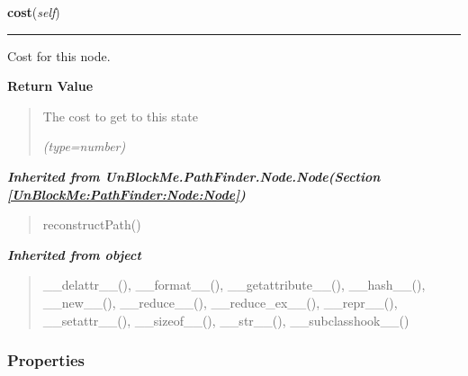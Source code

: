    \label{UnBlockMe:PathFinder:AStarNode:AStarNode:cost}

    \vspace{0.5ex}

\hspace{.8\funcindent}\begin{boxedminipage}{\funcwidth}

    \raggedright \textbf{cost}(\textit{self})

    \vspace{-1.5ex}

    \rule{\textwidth}{0.5\fboxrule}
\setlength{\parskip}{2ex}
    Cost for this node.

\setlength{\parskip}{1ex}
      \textbf{Return Value}
    \vspace{-1ex}

      \begin{quote}
      The cost to get to this state

      {\it (type=number)}

      \end{quote}

    \end{boxedminipage}


\large{\textbf{\textit{Inherited from UnBlockMe.PathFinder.Node.Node\textit{(Section \ref{UnBlockMe:PathFinder:Node:Node})}}}}

\begin{quote}
reconstructPath()
\end{quote}

\large{\textbf{\textit{Inherited from object}}}

\begin{quote}
\_\_delattr\_\_(), \_\_format\_\_(), \_\_getattribute\_\_(), \_\_hash\_\_(), \_\_new\_\_(), \_\_reduce\_\_(), \_\_reduce\_ex\_\_(), \_\_repr\_\_(), \_\_setattr\_\_(), \_\_sizeof\_\_(), \_\_str\_\_(), \_\_subclasshook\_\_()
\end{quote}


  \subsubsection{Properties}

